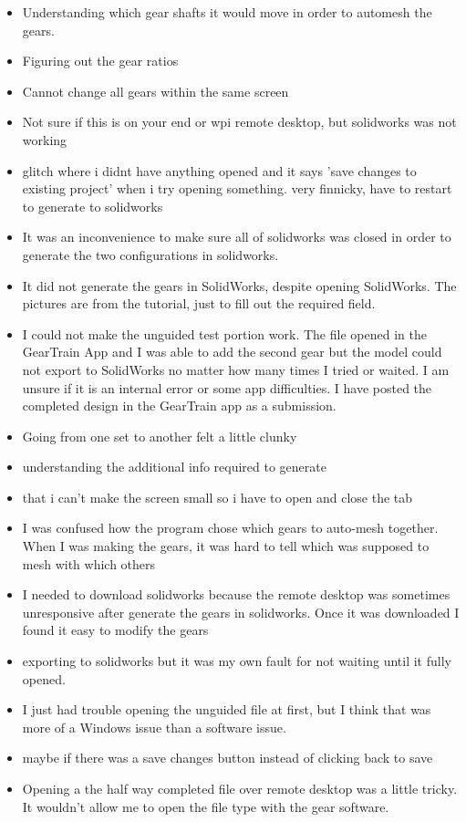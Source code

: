 \begin{itemize}
\item Understanding which gear shafts it would move in order to automesh the gears.
\item Figuring out the gear ratios
\item Cannot change all gears within the same screen
\item Not sure if this is on your end or wpi remote desktop, but solidworks was not working
\item glitch where i didnt have anything opened and it says 'save changes to existing project' when i try opening something. very finnicky, have to restart to generate to solidworks
\item It was an inconvenience to make sure all of solidworks was closed in order to generate the two configurations in solidworks.
\item It did not generate the gears in SolidWorks, despite opening SolidWorks. The pictures are from the tutorial, just to fill out the required field.
\item I could not make the unguided test portion work. The file opened in the GearTrain App and I was able to add the second gear but the model could not export to SolidWorks no matter how many times I tried or waited. I am unsure if it is an internal error or some app difficulties. I have posted the completed design in the GearTrain app as a submission.
\item Going from one set to another felt a little clunky
\item understanding the additional info required to generate 
\item that i can't make the screen small so i have to open and close the tab
\item I was confused how the program chose which gears to auto-mesh together. When I was making the gears, it was hard to tell which was supposed to mesh with which others
\item I needed to download solidworks because the remote desktop was sometimes unresponsive after generate the gears in solidworks. Once it was downloaded I found it easy to modify the gears
\item exporting to solidworks but it was my own fault for not waiting until it fully opened. 
\item I just had trouble opening the unguided file at first, but I think that was more of a Windows issue than a software issue.
\item maybe if there was a save changes button instead of clicking back to save 
\item Opening a the half way completed file over remote desktop was a little tricky. It wouldn't allow me to open the file type with the gear software.

\end{itemize}
